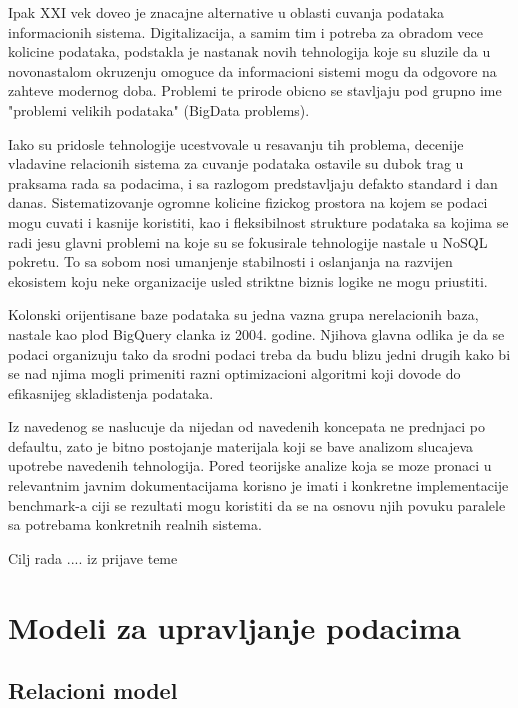 \documentclass[12pt,oneside]{memoir}
\begin{document}
Ipak XXI vek doveo je znacajne alternative u oblasti cuvanja podataka informacionih sistema. Digitalizacija, a samim tim i potreba za obradom vece kolicine podataka, podstakla je nastanak novih tehnologija koje su sluzile da u novonastalom okruzenju omoguce da informacioni sistemi mogu da odgovore na zahteve modernog doba. Problemi te prirode obicno se stavljaju pod grupno ime "problemi velikih podataka" (BigData problems).

Iako su pridosle tehnologije ucestvovale u resavanju tih problema, decenije vladavine  relacionih sistema za cuvanje podataka ostavile su dubok trag u praksama rada sa podacima,  i sa razlogom predstavljaju defakto standard i dan danas. 
Sistematizovanje ogromne kolicine fizickog prostora na kojem se podaci mogu cuvati i kasnije koristiti, kao i fleksibilnost strukture podataka sa kojima se radi jesu glavni problemi na koje su se fokusirale tehnologije nastale u NoSQL pokretu. To sa sobom nosi umanjenje stabilnosti i oslanjanja na razvijen ekosistem koju neke organizacije  usled striktne biznis logike ne mogu priustiti. 

Kolonski orijentisane baze podataka su jedna vazna grupa nerelacionih baza, nastale kao plod BigQuery clanka iz 2004. godine. Njihova glavna odlika je da se podaci organizuju tako da srodni podaci treba da budu blizu jedni drugih kako bi se nad njima mogli primeniti razni optimizacioni algoritmi koji dovode do efikasnijeg skladistenja podataka.

Iz navedenog se naslucuje da nijedan od navedenih koncepata ne prednjaci po defaultu, zato je bitno postojanje materijala koji se bave analizom slucajeva upotrebe navedenih tehnologija. Pored teorijske analize koja se moze pronaci u relevantnim javnim dokumentacijama korisno je imati i konkretne implementacije benchmark-a ciji se rezultati mogu koristiti da se na osnovu  njih povuku paralele sa potrebama konkretnih realnih sistema.

Cilj rada .... iz prijave teme

\cite{PostgresHistory}


\chapter{Modeli za upravljanje podacima}
\label{chp:razrada}
\section{Relacioni model}
\end{document}
